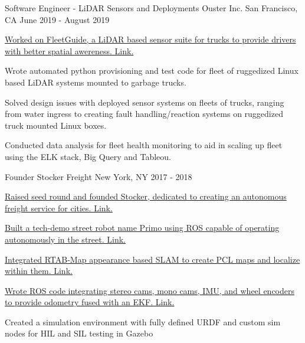 \begin{cventries}
  \cventry
    {Software Engineer - LiDAR Sensors and Deployments} %
    {Ouster Inc.} %
    {San Francisco, CA} %
    {June 2019 - August 2019} %
    {
      \begin{cvitems} %
        \item {\href{https://www.fleetguide.io/}
                {Worked on FleetGuide, a LiDAR based sensor suite for trucks to provide drivers with better spatial awereness. \color{darkblue}Link.}}
        \item {Wrote automated python provisioning and test code for fleet of ruggedized Linux based LiDAR systems mounted to garbage trucks.}
        \item {Solved design issues with deployed sensor systems on fleets of trucks, ranging from water ingress to creating fault handling/reaction
        systems on ruggedized truck mounted Linux boxes.}
        \item {Conducted data analysis for fleet health monitoring to aid in scaling up fleet using the ELK stack, Big Query and Tableou.}
      \end{cvitems}
    }

  \cventry
    {Founder} %
    {Stocker Freight} %
    {New York, NY} %
    {2017 - 2018} %
    {
      \begin{cvitems} %
        \item {\href{https://paulsammut.com/lib/exe/fetch.php/seed_deck_r14.pdf}
              {Raised seed round and founded Stocker, dedicated to creating an autonomous freight service for cities. \color{darkblue}Link.}}
        \item {\href{https://paulsammut.com/doku.php/primo_robot}
            {Built a tech-demo street robot name Primo using ROS capable of operating autonomously in the street. \color{darkblue}Link.}}
        \item {\href{https://paulsammut.com/doku.php/stereo_cameras}
            {Integrated RTAB-Map appearance based SLAM to create PCL maps and localize within them. \color{darkblue}Link.}}
        \item {\href{http://bit.ly/2T3d4sU}
            {Wrote ROS code integrating stereo cams, mono cams, IMU, and wheel encoders to provide odometry fused with an EKF. \color{darkblue}Link.}}
        \item {Created a simulation environment with fully defined URDF and custom sim nodes for HIL and SIL testing in Gazebo}
      \end{cvitems}
    }


\end{cventries}
